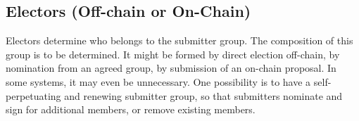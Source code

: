 \subsection{Electors (Off-chain or On-Chain)}

Electors determine who belongs to the submitter group.  The composition of this group is to be determined.  It might be formed by direct election off-chain, by
nomination from an agreed group, by submission of an on-chain proposal.  In some systems, it may even be unnecessary.
One possibility is to have a self-perpetuating and renewing submitter group, so that submitters nominate and sign for additional members, or remove existing members.

